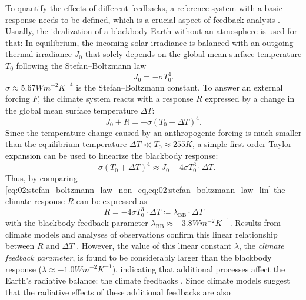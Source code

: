 To quantify the effects of different feedbacks, a reference system with a basic
response needs to be defined, which is a crucial aspect of feedback analysis
\autocite{Roe2009}. Usually, the idealization of a blackbody Earth without an
atmosphere is used for that: In equilibrium, the incoming solar irradiance is
balanced with an outgoing thermal irradiance $J_0$ that solely depends on the
global mean surface temperature $T_0$ following the Stefan–Boltzmann law
\begin{equation}
  J_0 = -\sigma T_0^4.
  \label{eq:02:stefan_boltzmann_law_eq}
\end{equation}
$\sigma \approx 5.67 \unit{W m^{-2} K^{-4}}$ is the Stefan–Boltzmann constant.
To answer an external forcing $F$, the climate system reacts with a response
$R$ expressed by a change in the global mean surface temperature $\Delta T$:
\begin{equation}
  J_0 + R = -\sigma \left( T_0 + \Delta T \right)^4.
  \label{eq:02:stefan_boltzmann_law_non_eq}
\end{equation}
Since the temperature change caused by an anthropogenic forcing is much smaller
than the equilibrium temperature $\Delta T \ll T_0 \approx 255 \unit{K}$, a
simple first-order Taylor expansion can be used to linearize the blackbody
response:
\begin{equation}
  -\sigma \left( T_0 + \Delta T \right)^4 \approx J_0 - 4 \sigma T_0^3 \cdot
  \Delta T.
  \label{eq:02:stefan_boltzmann_law_lin}
\end{equation}
Thus, by comparing
\cref{eq:02:stefan_boltzmann_law_non_eq,eq:02:stefan_boltzmann_law_lin} the
climate response $R$ can be expressed as
\begin{equation}
  R = -4 \sigma T_0^3 \cdot \Delta T \coloneq \lambda_\text{BB} \cdot \Delta T
  \label{eq:02:linear_blackbody_response}
\end{equation}
with the blackbody feedback parameter $\lambda_\text{BB} \approx -3.8 \unit{W
  m^{-2} K^{-1}}$. Results from climate models and analyses of observations
confirm this linear relationship between $R$ and $\Delta T$
\autocite{Gregory2004}. However, the value of this linear constant $\lambda$,
the \emph{climate feedback parameter}, is found to be considerably larger than
the blackbody response ($\lambda \approx -1.0 \unit{W m^{-2} K^{-1}}$),
indicating that additional processes affect the Earth's radiative balance: the
climate feedbacks \autocite{Flato2013, Gregory2009}. Since climate models
suggest that the radiative effects of these additional feedbacks are also
